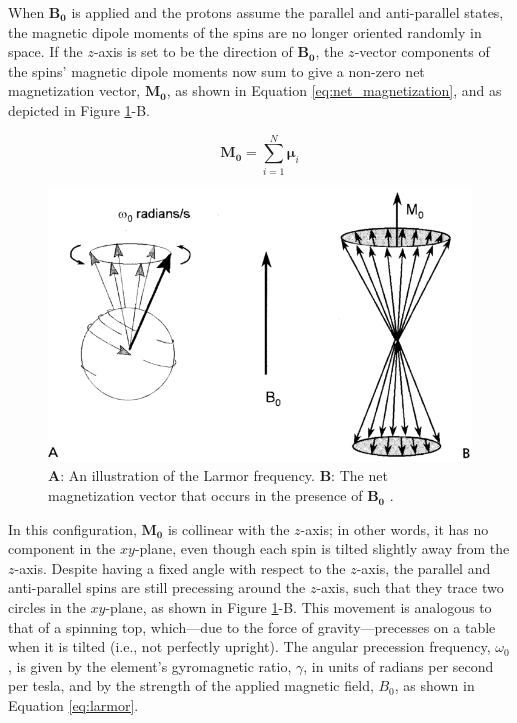 \documentclass[12pt]{article} %
\renewcommand{\vec}[1]{\mathbf{#1}}
\begin{document}
When $\vec{B_{0}}$ is applied and the protons assume the parallel and anti-parallel states, the magnetic dipole moments of the spins are no longer oriented randomly in space. If the $z$-axis is set to be the direction of $\vec{B_{0}}$, the $z$-vector components of the spins' magnetic dipole moments now sum to give a non-zero net magnetization vector, $\vec{M_{0}}$, as shown in Equation \ref{eq:net_magnetization}, and as depicted in Figure \ref{fig:spins_in_b0}-B.

\begin{equation}
\vec{M_{0}} = \sum\limits_{i=1}^N\boldsymbol{\mu}_{i}
\label{eq:net_magnetization}
\end{equation}

\begin{figure}[h]
\centering
\includegraphics[scale=0.75]{./images/spins_in_b0.png}
\caption{\textbf{A}: An illustration of the Larmor frequency. \textbf{B}: The net magnetization vector that occurs in the presence of $\vec{B_{0}}$ \cite{bushberg2002}.}
\label{fig:spins_in_b0}
\end{figure}

In this configuration, $\vec{M_{0}}$ is collinear with the $z$-axis; in other words, it has no component in the $xy$-plane, even though each spin is tilted slightly away from the $z$-axis.
Despite having a fixed angle with respect to the $z$-axis, the parallel and anti-parallel spins are still precessing around the $z$-axis, such that they trace two circles in the $xy$-plane, as shown in Figure \ref{fig:spins_in_b0}-B.
This movement is analogous to that of a spinning top, which---due to the force of gravity---precesses on a table when it is tilted (i.e., not perfectly upright). 
The angular precession frequency, $\omega_{0}$, is given by the element's gyromagnetic ratio, $\gamma$, in units of radians per second per tesla, and by the strength of the applied magnetic field, $B_{0}$, as shown in Equation \ref{eq:larmor}. 
\end{document}
